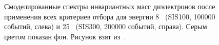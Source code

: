 \begin{figure}[H]
\begin{minipage}[t]{0.495\textwidth}
\end{minipage}
\caption{Смоделированные спектры инвариантных масс диэлектронов после применения всех критериев отбора для энергии 8~\GeVperNucl{} (SIS100, 100000 событий, слева) и 25~\GeVperNucl{} (SIS300, 200000 событий, справа). Серым цветом показан фон. Рисунок взят из~\cite{TDR_RICH}.}
\label{fig:InvMassSpectra}
\end{figure}


